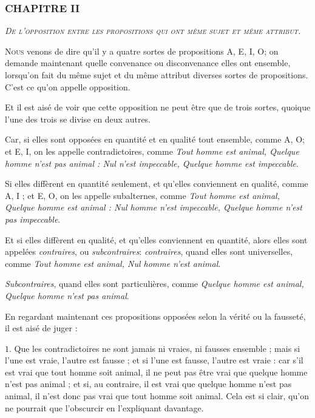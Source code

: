 \subsubsection{\centering \Large CHAPITRE II}
\begin{center}\emph{\large\scshape De l'opposition entre les propositions qui ont même sujet et même attribut.}\end{center}

	\lettrine{N}{ous} venons de dire qu'il y a quatre sortes de propositions A, E, I, O; on demande maintenant quelle convenance ou disconvenance elles ont ensemble, lorsqu'on fait du même sujet et du même attribut diverses sortes de propositions. C'est ce qu'on appelle opposition.

Et il est aisé de voir que cette opposition ne peut être que de trois sortes, quoique l'une des trois se divise en deux autres.

Car, si elles sont opposées en quantité et en qualité tout ensemble, comme A, O; et E, I, on les appelle contradictoires, comme \emph{Tout homme est animal, Quelque homme n'est pas animal : Nul n'est impeccable, Quelque homme est impeccable}.

Si elles diffèrent en quantité seulement, et qu'elles conviennent en qualité, comme A, I ; et E, O, on les appelle subalternes, comme \emph{Tout homme est animal, Quelque homme est animal : Nul homme n'est impeccable, Quelque homme n'est pas impeccable}.

Et si elles diffèrent en qualité, et qu'elles conviennent en quantité, alors elles sont appelées \emph{contraires}, ou \emph{subcontraires}: \emph{contraires}, quand elles sont universelles, comme \emph{Tout homme est animal, Nul homme n'est animal}.

\emph{Subcontraires}, quand elles sont particulières, comme \emph{Quelque homme est animal, Quelque homme n'est pas animal}.

En regardant maintenant ces propositions opposées selon la vérité ou la fausseté, il est aisé de juger :

\bigbreak
{$1$.} Que les contradictoires ne sont jamais ni vraies, ni fausses ensemble ; mais si l'une est vraie, l'autre est fausse ; et si l'une est fausse, l'autre est vraie : car s'il est vrai que tout homme soit animal, il ne peut pas être vrai que quelque homme n'est pas animal ; et si, au contraire, il est vrai que quelque homme n'est pas animal, il n'est donc pas vrai que tout homme soit animal. Cela est si clair, qu'on ne pourrait que l'obscurcir en l'expliquant davantage.

